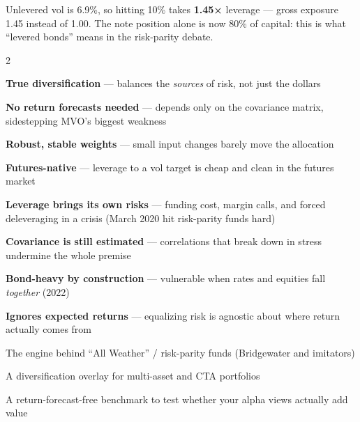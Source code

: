 \documentclass{pyportfolios-note}
\begin{document}
Unlevered vol is 6.9\%, so hitting 10\% takes \textbf{1.45×} leverage — gross
exposure 1.45 instead of 1.00. The note position alone is now 80\% of capital:
this is what ``levered bonds'' means in the risk-parity debate.

\noteneedroom{330bp}

\begin{multicols}{2}
\begin{notebullets}
\item \textbf{True diversification} — balances the \textit{sources} of risk, not
      just the dollars
\item \textbf{No return forecasts needed} — depends only on the covariance
      matrix, sidestepping MVO's biggest weakness
\item \textbf{Robust, stable weights} — small input changes barely move the
      allocation
\item \textbf{Futures-native} — leverage to a vol target is cheap and clean in
      the futures market
\end{notebullets}

\begin{notebullets}
\item \textbf{Leverage brings its own risks} — funding cost, margin calls, and
      forced deleveraging in a crisis (March 2020 hit risk-parity funds hard)
\item \textbf{Covariance is still estimated} — correlations that break down in
      stress undermine the whole premise
\item \textbf{Bond-heavy by construction} — vulnerable when rates and equities
      fall \textit{together} (2022)
\item \textbf{Ignores expected returns} — equalizing risk is agnostic about
      where return actually comes from
\end{notebullets}

\begin{notebullets}
\item The engine behind ``All Weather'' / risk-parity funds (Bridgewater and
      imitators)
\item A diversification overlay for multi-asset and CTA portfolios
\item A return-forecast-free benchmark to test whether your alpha views actually
      add value
\end{notebullets}


\end{multicols}
\end{document}
